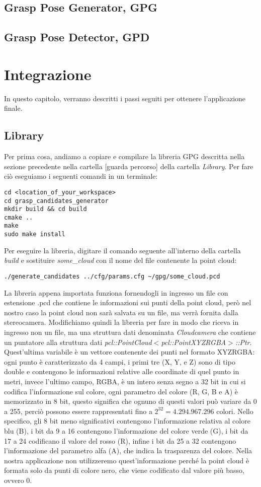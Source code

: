 \documentclass{report}
\begin{document}
\section{Grasp Pose Generator, GPG}\label{GPG}
\section{Grasp Pose Detector, GPD}\label{GPD}

\newpage
\chapter{Integrazione}\label{integrazione}
In questo capitolo, verranno descritti i passi seguiti per ottenere l'applicazione finale.
\section{Library}
Per prima cosa, andiamo a copiare e compilare la libreria GPG descritta nella sezione precedente nella cartella [guarda percorso] della cartella \textit{Library}. Per fare ciò eseguiamo i seguenti comandi in un terminale:
\begin{verbatim}
cd <location_of_your_workspace>
cd grasp_candidates_generator
mkdir build && cd build
cmake ..
make
sudo make install
\end{verbatim}
Per eseguire la libreria, digitare il comando seguente all'interno della cartella \textit{build} e sostituire \textit{some\_cloud} con il nome del file contenente la point cloud:
\begin{verbatim}
./generate_candidates ../cfg/params.cfg ~/gpg/some_cloud.pcd
\end{verbatim}
La libreria appena importata funziona fornendogli in ingresso un file con estensione .pcd che contiene le informazioni sui punti della point cloud, però nel nostro caso la point cloud non sarà salvata su un file, ma verrà fornita dalla stereocamera. Modifichiamo quindi la libreria per fare in modo che riceva in ingresso non un file, ma una struttura dati denominata \textit{Cloudcamera} che contiene un puntatore alla struttura dati \textit{pcl::PointCloud$<$pcl::PointXYZRGBA$>$::Ptr}. Quest'ultima variabile è un vettore contenente dei punti nel formato XYZRGBA: ogni punto è caratterizzato da 4 campi, i primi tre (X, Y, e Z) sono di tipo double e contengono le informazioni relative alle coordinate di quel punto in metri, invece l'ultimo campo, RGBA, è un intero senza segno a 32 bit in cui si codifica l'informazione sul colore, ogni parametro del colore (R, G, B e A) è memorizzato in 8 bit, questo significa che ognuno di questi valori può variare da 0 a 255, perciò possono essere rappresentati fino a $\displaystyle{2^{32}=4.294.967.296}$ colori. Nello specifico, gli 8 bit meno significativi contengono l'informazione relativa al colore blu (B), i bit da 9 a 16 contengono l'informazione del colore verde (G), i bit da 17 a 24 codificano il valore del rosso (R), infine i bit da 25 a 32 contengono l'informazione del parametro alfa (A), che indica la trasparenza del colore. Nella nostra applicazione non utilizzeremo quest'informazione perché la point cloud è formata solo da punti di colore nero, che viene codificato dal valore più basso, ovvero 0. \par
\end{document}
